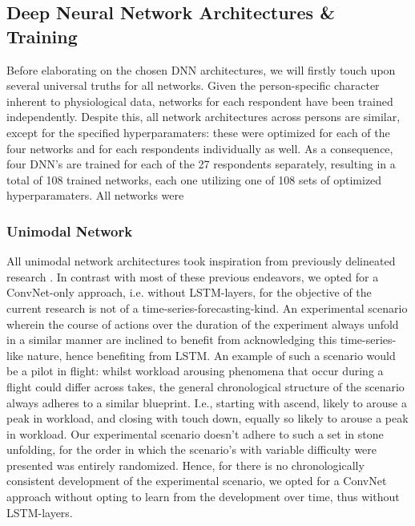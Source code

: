 \documentclass[12pt]{article}
\begin{document}
\subsection{Deep Neural Network Architectures \& Training} \label{section:DNN}
Before elaborating on the chosen DNN architectures, we will firstly touch upon several universal truths for all networks.  Given the person-specific character inherent to physiological data,  networks for each respondent have been trained independently. Despite this, all network architectures across persons are similar, except for the specified hyperparamaters: these were optimized for each of the four networks and for each respondents individually as well. As a consequence, four DNN's are trained for each of the 27 respondents separately, resulting in a total of 108 trained networks, each one utilizing one of 108 sets of optimized hyperparamaters. All networks were 

\subsubsection{Unimodal Network}
All unimodal network architectures took inspiration from previously delineated research \cite{schirrmeister2017deep} \cite{dolmans2020perceived} \cite{sun2019hybrid} \cite{biswas2019cornet}. In contrast with most of these previous endeavors, we opted for a ConvNet-only approach, i.e. without LSTM-layers, for the objective of the current research is not of a time-series-forecasting-kind. An experimental scenario wherein the course of actions over the duration of the experiment always unfold in a similar manner are inclined to benefit from acknowledging this time-series-like nature, hence benefiting from LSTM. An example of such a scenario would be a pilot in flight: whilst workload arousing phenomena that occur during a flight could differ across takes, the general chronological structure of the scenario always adheres to a similar blueprint. I.e., starting with ascend, likely to arouse a peak in workload, and closing with touch down, equally so likely to arouse a peak in workload. Our experimental scenario doesn't adhere to such a set in stone unfolding, for the order in which the scenario's with variable difficulty were presented was entirely randomized.  Hence, for there is no chronologically consistent development of the experimental scenario, we opted for a ConvNet approach without opting to learn from the development over time, thus without LSTM-layers.  
\end{document}
